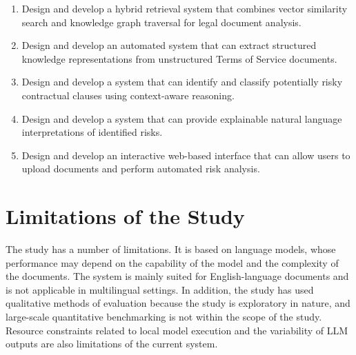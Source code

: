\begin{enumerate}
  \item Design and develop a hybrid retrieval system that combines
    vector similarity search and knowledge graph traversal for legal
    document analysis.
  \item Design and develop an automated system that can extract
    structured knowledge representations from unstructured Terms of
    Service documents.
  \item Design and develop a system that can identify and classify
    potentially risky contractual clauses using context-aware reasoning.
  \item Design and develop a system that can provide explainable
    natural language interpretations of identified risks.
  \item Design and develop an interactive web-based interface that
    can allow users to upload documents and perform automated risk analysis.
\end{enumerate}

\section{Limitations of the Study}

The study has a number of limitations. It is based on language
models, whose performance may depend on the capability of the model
and the complexity of the documents. The system is mainly suited for
English-language documents and is not applicable in multilingual
settings. In addition, the study has used qualitative methods of
evaluation because the study is exploratory in nature, and
large-scale quantitative benchmarking is not within the scope of the study.
Resource constraints related to local model execution and the
variability of LLM outputs are also limitations of the current system.

